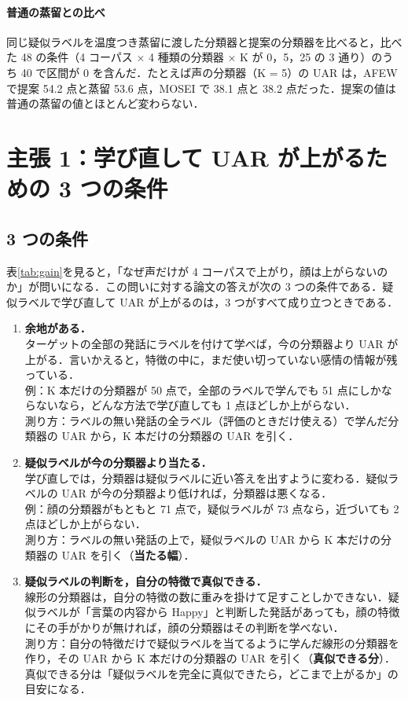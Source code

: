 \documentclass[a4paper,11pt]{ltjsarticle}
\begin{document}
\paragraph{普通の蒸留との比べ}
同じ疑似ラベルを温度つき蒸留に渡した分類器と提案の分類器を比べると，比べた 48 の条件（4 コーパス × 4 種類の分類器 × K が 0，5，25 の 3 通り）のうち 40 で区間が 0 を含んだ．たとえば声の分類器（K = 5）の UAR は，AFEW で提案 54.2 点と蒸留 53.6 点，MOSEI で 38.1 点と 38.2 点だった．提案の値は普通の蒸留の値とほとんど変わらない．

\section{主張 1：学び直して UAR が上がるための 3 つの条件}

\subsection{3 つの条件}

表\ref{tab:gain}を見ると，「なぜ声だけが 4 コーパスで上がり，顔は上がらないのか」が問いになる．この問いに対する論文の答えが次の 3 つの条件である．疑似ラベルで学び直して UAR が上がるのは，3 つがすべて成り立つときである．

\begin{enumerate}
  \item \textbf{余地がある．}\\
  ターゲットの全部の発話にラベルを付けて学べば，今の分類器より UAR が上がる．言いかえると，特徴の中に，まだ使い切っていない感情の情報が残っている．\\
  例：K 本だけの分類器が 50 点で，全部のラベルで学んでも 51 点にしかならないなら，どんな方法で学び直しても 1 点ほどしか上がらない．\\
  測り方：ラベルの無い発話の全ラベル（評価のときだけ使える）で学んだ分類器の UAR から，K 本だけの分類器の UAR を引く．

  \item \textbf{疑似ラベルが今の分類器より当たる．}\\
  学び直しでは，分類器は疑似ラベルに近い答えを出すように変わる．疑似ラベルの UAR が今の分類器より低ければ，分類器は悪くなる．\\
  例：顔の分類器がもともと 71 点で，疑似ラベルが 73 点なら，近づいても 2 点ほどしか上がらない．\\
  測り方：ラベルの無い発話の上で，疑似ラベルの UAR から K 本だけの分類器の UAR を引く（\textbf{当たる幅}）．

  \item \textbf{疑似ラベルの判断を，自分の特徴で真似できる．}\\
  線形の分類器は，自分の特徴の数に重みを掛けて足すことしかできない．疑似ラベルが「言葉の内容から Happy」と判断した発話があっても，顔の特徴にその手がかりが無ければ，顔の分類器はその判断を学べない．\\
  測り方：自分の特徴だけで疑似ラベルを当てるように学んだ線形の分類器を作り，その UAR から K 本だけの分類器の UAR を引く（\textbf{真似できる分}）．真似できる分は「疑似ラベルを完全に真似できたら，どこまで上がるか」の目安になる．
\end{enumerate}
\end{document}
